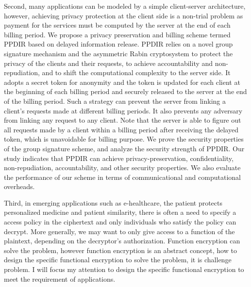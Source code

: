\documentclass[letterpaper,12pt]{article}
\begin{document}
      Second, many applications can be modeled by a simple client-server architecture, however, achieving privacy protection at the client side is a non-trial problem as payment for the services must be computed by the server at the end of each billing period. We propose a privacy preservation and billing scheme termed PPDIR based on delayed information release. PPDIR relies on a novel group signature mechanism and the asymmetric Rabin cryptosystem to protect the privacy of the clients and their requests, to achieve accountability and non-repudiation, and to shift the computational complexity to the server side. It adopts a secret token for anonymity and the token is updated for each client at the beginning of each billing period and securely released to the server at the end of the billing period. Such a strategy can prevent the server from linking a client's requests made at different billing periods.  It also prevents any adversary from linking any request to any client. Note that the server is able to figure out all requests made by a client within a billing period after receiving the delayed token, which is unavoidable for billing purpose. We prove the security properties of the group signature scheme, and analyze the security strength of PPDIR. Our study indicates that PPDIR can achieve privacy-preservation, confidentiality, non-repudiation, accountability, and other security properties. We also evaluate the performance of our scheme in terms of communicational and computational overheads.

      Third, in emerging applications such as e-healthcare, the patient protects personalized medicine and patient similarity, there is often a need to specify a access policy in the ciphertext and only individuals who satisfy the policy can decrypt. More generally, we may want to only give access to a function of the plaintext, depending on the decryptor's authorization. Function encryption can solve the problem, however function encryption is an abstract concept, how to design the specific functional encryption to solve the problem, it is challenge problem. I will focus my attention to design the specific functional encryption to meet the requirement of applications.
      \newpage

   \tableofcontents
   \restoregeometry
   \newpage


   \cleardoublepage
    \label{listoffig}
   \begin{center}
       \listoffigures
   \end{center}
   \newpage
\end{document}
